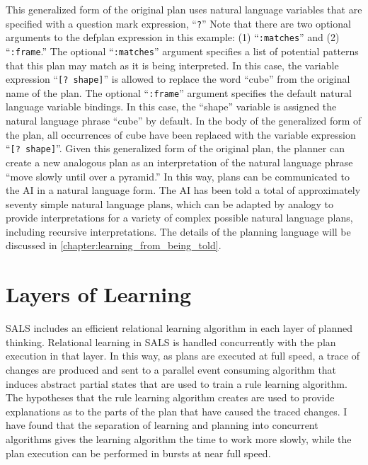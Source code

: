 This generalized form of the original plan uses natural language
variables that are specified with a question mark expression,
``{\tt{?}}''  Note that there are two optional arguments to the
defplan expression in this example: (1) ``{\tt{:matches}}'' and (2)
``{\tt{:frame}}.''  The optional ``{\tt{:matches}}'' argument
specifies a list of potential patterns that this plan may match as it
is being interpreted.  In this case, the variable expression ``{\tt{[?
      shape]}}'' is allowed to replace the word ``cube'' from the
original name of the plan.  The optional ``{\tt{:frame}}'' argument
specifies the default natural language variable bindings.  In this
case, the ``shape'' variable is assigned the natural language phrase
``cube'' by default.  In the body of the generalized form of the plan,
all occurrences of cube have been replaced with the variable
expression ``{\tt{[? shape]}}''.  Given this generalized form of the
original plan, the planner can create a new analogous plan as an
interpretation of the natural language phrase ``move slowly until over
a pyramid.''  In this way, plans can be communicated to the AI in a
natural language form.  The AI has been told a total of approximately
seventy simple natural language plans, which can be adapted by analogy
to provide interpretations for a variety of complex possible natural
language plans, including recursive interpretations.  The details of
the planning language will be discussed in
{\mbox{\autoref{chapter:learning_from_being_told}}}.

\section{Layers of Learning}

SALS includes an efficient relational learning algorithm in each layer
of planned thinking.  Relational learning in SALS is handled
concurrently with the plan execution in that layer.  In this way, as
plans are executed at full speed, a trace of changes are produced and
sent to a parallel event consuming algorithm that induces abstract
partial states that are used to train a rule learning algorithm.  The
hypotheses that the rule learning algorithm creates are used to
provide explanations as to the parts of the plan that have caused the
traced changes.  I have found that the separation of learning and
planning into concurrent algorithms gives the learning algorithm the
time to work more slowly, while the plan execution can be performed in
bursts at near full speed.

